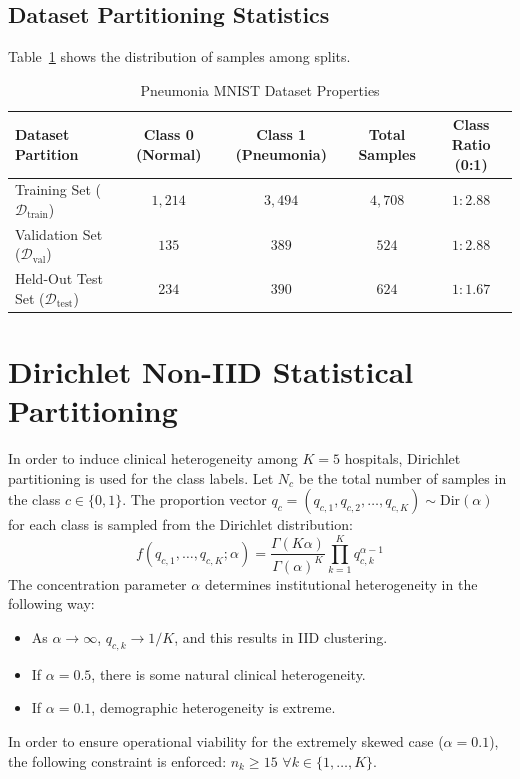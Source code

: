 \documentclass[12pt,a4paper]{report}
\begin{document}
\subsection{Dataset Partitioning Statistics}
Table~\ref{tab:dataset_stats} shows the distribution of samples among splits.

\begin{table}[htbp]
\centering
\caption{Pneumonia MNIST Dataset Properties}
\label{tab:dataset_stats}
\begin{tabular}{lcccc}
\toprule
\textbf{Dataset Partition} & \textbf{Class 0 (Normal)} & \textbf{Class 1 (Pneumonia)} & \textbf{Total Samples} & \textbf{Class Ratio (0:1)} \\
\midrule
Training Set ($\mathcal{D}_{\text{train}}$)     & $1{,}214$ & $3{,}494$ & $4{,}708$ & $1 : 2.88$ \\
Validation Set ($\mathcal{D}_{\text{val}}$)     & $135$     & $389$     & $524$     & $1 : 2.88$ \\
Held-Out Test Set ($\mathcal{D}_{\text{test}}$) & $234$     & $390$     & $624$     & $1 : 1.67$ \\
\bottomrule
\end{tabular}
\end{table}

\section{Dirichlet Non-IID Statistical Partitioning}
In order to induce clinical heterogeneity among $K=5$ hospitals, Dirichlet partitioning is used for the class labels. Let $N_c$ be the total number of samples in the class $c \in \{0,1\}$. The proportion vector $q_c = (q_{c,1}, q_{c,2}, \dots, q_{c,K}) \sim \text{Dir}(\alpha)$ for each class is sampled from the Dirichlet distribution:
\begin{equation}
    f(q_{c,1}, \dots, q_{c,K}; \alpha) = \frac{\Gamma(K\alpha)}{\Gamma(\alpha)^K} \prod_{k=1}^K q_{c,k}^{\alpha - 1}
\end{equation}
The concentration parameter $\alpha$ determines institutional heterogeneity in the following way:
\begin{itemize}
    \item As $\alpha \to \infty$, $q_{c,k} \to 1/K$, and this results in IID clustering.
    \item If $\alpha = 0.5$, there is some natural clinical heterogeneity.
    \item If $\alpha = 0.1$, demographic heterogeneity is extreme.
\end{itemize}
In order to ensure operational viability for the extremely skewed case ($\alpha = 0.1$), the following constraint is enforced: $n_k \ge 15$ $\forall k \in \{1, \dots, K\}$.
\end{document}
